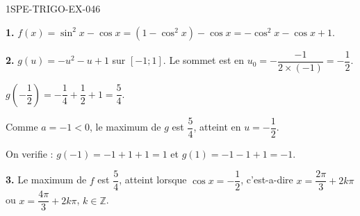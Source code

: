 \begin{corrige}{1SPE-TRIGO-EX-046}

\textbf{1.} $f(x) = \sin^2 x - \cos x = (1 - \cos^2 x) - \cos x = -\cos^2 x - \cos x + 1$.

\textbf{2.} $g(u) = -u^2 - u + 1$ sur $[-1;1]$. Le sommet est en $u_0 = -\dfrac{-1}{2 \times (-1)} = -\dfrac{1}{2}$.

$g\!\left(-\dfrac{1}{2}\right) = -\dfrac{1}{4} + \dfrac{1}{2} + 1 = \dfrac{5}{4}$.

Comme $a = -1 < 0$, le maximum de $g$ est $\dfrac{5}{4}$, atteint en $u = -\dfrac{1}{2}$.

On verifie : $g(-1) = -1 + 1 + 1 = 1$ et $g(1) = -1 - 1 + 1 = -1$.

\textbf{3.} Le maximum de $f$ est $\dfrac{5}{4}$, atteint lorsque $\cos x = -\dfrac{1}{2}$, c'est-a-dire $x = \dfrac{2\pi}{3} + 2k\pi$ ou $x = \dfrac{4\pi}{3} + 2k\pi$, $k \in \mathbb{Z}$.

\end{corrige}
